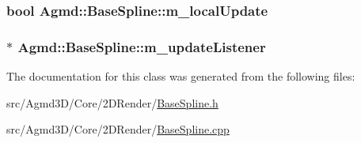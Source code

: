 \hypertarget{class_agmd_1_1_base_spline_a4b377a62d53901ea44ee613028d12f51}{
\subsubsection[{m\+\_\+local\+Update}]{\setlength{\rightskip}{0pt plus 5cm}bool Agmd\+::\+Base\+Spline\+::m\+\_\+local\+Update\hspace{0.3cm}{\ttfamily [protected]}}}\label{class_agmd_1_1_base_spline_a4b377a62d53901ea44ee613028d12f51}
\hypertarget{class_agmd_1_1_base_spline_a653646442f440a75f92d8913264e429c}{
\subsubsection[{m\+\_\+update\+Listener}]{$\ast$ Agmd\+::\+Base\+Spline\+::m\+\_\+update\+Listener\hspace{0.3cm}{\ttfamily [protected]}}}\label{class_agmd_1_1_base_spline_a653646442f440a75f92d8913264e429c}


The documentation for this class was generated from the following files\+:\begin{DoxyCompactItemize}
\item 
src/\+Agmd3\+D/\+Core/2\+D\+Render/\hyperlink{_base_spline_8h}{Base\+Spline.\+h}\item 
src/\+Agmd3\+D/\+Core/2\+D\+Render/\hyperlink{_base_spline_8cpp}{Base\+Spline.\+cpp}\end{DoxyCompactItemize}
